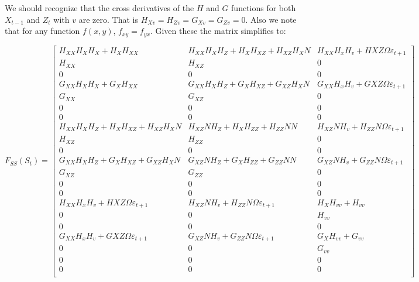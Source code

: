 \documentclass[letterpaper,12pt]{article}
\newcommand{\ve}{\varepsilon}
\theoremstyle{definition}
\begin{document}
\begin{spacing}{1.5}
		We should recognize that the cross derivatives of the $H$ and $G$ functions for both $X_{t-1}$ and $Z_t$ with $v$ are zero.  That is $H_{Xv} = H_{Zv} = G_{Xv} = G_{Zv} = 0$.  Also we note that for any function $f(x,y)$, $f_{xy} = f_{yx}$.  Given these the matrix simplifies to:

	    \begingroup\makeatletter{}\check@mathfonts
		\def\maketag@@@#1{\hbox{\m@th\normalsize\normalfont#1}}%
		\begin{equation} \label{Perturb_Fderiv2}
			F_{SS}(S_t) = \begin{bmatrix} H_{XX} H_X H_X + H_X H_{XX} & 
			H_{XX} H_X H_Z + H_X H_{XZ} + H_{XZ} H_X N & 
			H_{XX} H_x H_v + H{XZ} \Omega \ve_{t+1} \\ 
			H_{XX} & H_{XZ} & 0 \\ 0 & 0 & 0 \\ 
			G_{XX} H_X H_X + G_X H_{XX} & 
			G_{XX} H_X H_Z + G_X H_{XZ} + G_{XZ} H_X N & 
			G_{XX} H_x H_v + G{XZ} \Omega \ve_{t+1} \\ 
			G_{XX} & G_{XZ} & 0 \\ 0 & 0 & 0 \\ 0 & 0 & 0 \\
			H_{XX} H_X H_Z + H_X H_{XZ} + H_{XZ} H_X N & 
			H_{XZ} N H_Z + H_X H_{ZZ} + H_{ZZ} N N  & 
			H_{XZ} N H_v + H_{ZZ} N \Omega \ve_{t+1} \\ 
			H_{XZ} & H_{ZZ} & 0 \\ 0 & 0 & 0 \\ 
			G_{XX} H_X H_Z + G_X H_{XZ} + G_{XZ} H_X N & 
			G_{XZ} N H_Z + G_X H_{ZZ} + G_{ZZ} N N & 
			G_{XZ} N H_v + G_{ZZ} N \Omega \ve_{t+1} \\ 
			G_{XZ} & G_{ZZ} & 0 \\ 0 & 0 & 0 \\ 0 & 0 & 0 \\
			H_{XX} H_x H_v + H{XZ} \Omega \ve_{t+1} & 
			H_{XZ} N H_v + H_{ZZ} N \Omega \ve_{t+1}  & 
			H_X H_{vv} + H_{vv}  \\ 
			0 & 0 & H_{vv} \\ 0 & 0 & 0 \\ 
			G_{XX} H_x H_v + G{XZ} \Omega \ve_{t+1} & 
			G_{XZ} N H_v + G_{ZZ} N \Omega \ve_{t+1} & 
			G_X H_{vv} + G_{vv} \\
			0 & 0 & G_{vv} \\ 0 & 0 & 0 \\ 0 & 0 & 0 \\
			\end{bmatrix}
		\end{equation}
		\endgroup


\end{spacing}
\end{document}
